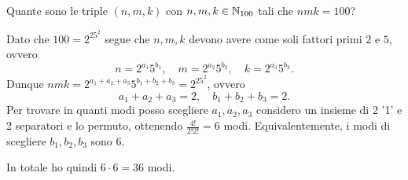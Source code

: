 \begin{example}
    Quante sono le triple $(n, m, k)$ con $n, m, k \in \mathbb{N}_{100}$ tali che $nmk = 100$?
\end{example}
\begin{solution}
    Dato che $100 = 2^25^2$ segue che $n, m, k$ devono avere come soli fattori primi $2$ e $5$, ovvero \[
        n = 2^{a_1}5^{b_1}, \quad m = 2^{a_2}5^{b_2}, \quad k = 2^{a_3}5^{b_3}.
    \]
    Dunque $nmk = 2^{a_1+a_2+a_3}5^{b_1+b_2+b_3} = 2^25^2$, ovvero \[
        a_1 + a_2 + a_3 = 2, \quad b_1 + b_2 + b_3 = 2.    
    \] Per trovare in quanti modi posso scegliere $a_1, a_2, a_3$ considero un insieme di 2 '1' e 2 separatori e lo permuto, ottenendo $\frac{4!}{2!2!} = 6$ modi. 
    Equivalentemente, i modi di scegliere $b_1, b_2, b_3$ sono 6.

    In totale ho quindi $6 \cdot 6 = 36$ modi.
\end{solution}

